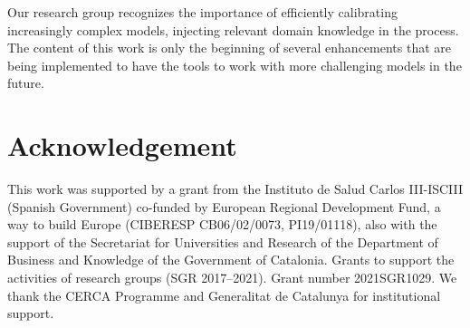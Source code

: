 \documentclass{IOS-Book-Article}
\begin{document}
	Our research group recognizes the importance of efficiently calibrating increasingly complex models, injecting relevant domain knowledge in the process. The content of this work is only the beginning of several enhancements that are being implemented to have the tools to work with more challenging models in the future.
	
	\section{Acknowledgement}
	This work was supported by a grant from the Instituto de Salud Carlos III-ISCIII (Spanish Government) co-funded by European Regional Development Fund, a way to build Europe (CIBERESP CB06/02/0073, PI19/01118), also with the support of the Secretariat for Universities and Research of the Department of Business and Knowledge of the Government of Catalonia. Grants to support the activities of research groups (SGR 2017–2021). Grant number 2021SGR1029. We thank the CERCA Programme and Generalitat de Catalunya for institutional support.
	
	
	
\end{document}
